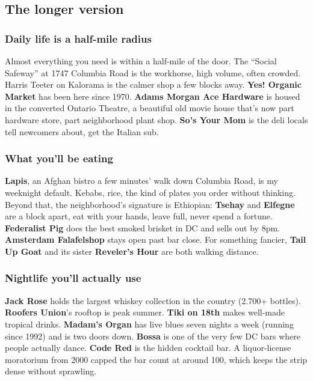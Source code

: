 \documentclass[11pt,a4paper]{article}
\begin{document}
\subsection*{The longer version}

\subsubsection*{Daily life is a half-mile radius}
Almost everything you need is within a half-mile of the door. The ``Social Safeway'' at 1747 Columbia Road is the workhorse, high volume, often crowded. Harris Teeter on Kalorama is the calmer shop a few blocks away. \textbf{Yes! Organic Market} has been here since 1970. \textbf{Adams Morgan Ace Hardware} is housed in the converted Ontario Theatre, a beautiful old movie house that's now part hardware store, part neighborhood plant shop. \textbf{So's Your Mom} is the deli locals tell newcomers about, get the Italian sub.

\subsubsection*{What you'll be eating}
\textbf{Lapis}, an Afghan bistro a few minutes' walk down Columbia Road, is my weeknight default. Kebabs, rice, the kind of plates you order without thinking. Beyond that, the neighborhood's signature is Ethiopian: \textbf{Tsehay} and \textbf{Elfegne} are a block apart, eat with your hands, leave full, never spend a fortune. \textbf{Federalist Pig} does the best smoked brisket in DC and sells out by 8pm. \textbf{Amsterdam Falafelshop} stays open past bar close. For something fancier, \textbf{Tail Up Goat} and its sister \textbf{Reveler's Hour} are both walking distance.

\subsubsection*{Nightlife you'll actually use}
\textbf{Jack Rose} holds the largest whiskey collection in the country (2.700+ bottles). \textbf{Roofers Union}'s rooftop is peak summer. \textbf{Tiki on 18th} makes well-made tropical drinks. \textbf{Madam's Organ} has live blues seven nights a week (running since 1992) and is two doors down. \textbf{Bossa} is one of the very few DC bars where people actually dance. \textbf{Code Red} is the hidden cocktail bar. A liquor-license moratorium from 2000 capped the bar count at around 100, which keeps the strip dense without sprawling.
\end{document}
